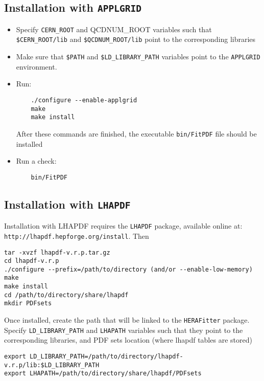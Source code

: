 \subsection{Installation with {\tt APPLGRID}}
\begin{itemize}
\item
 Specify {\tt CERN\_ROOT} and {QCDNUM\_ROOT} variables such that\\
     \verb'$CERN_ROOT/lib' and \verb'$QCDNUM_ROOT/lib'
 point to the corresponding libraries
\item Make sure that {\tt \$PATH} and {\tt \$LD\_LIBRARY\_PATH} 
variables point to the {\tt APPLGRID} environment.
\item Run:
\begin{verbatim}
    ./configure --enable-applgrid
    make 
    make install
\end{verbatim}
After these commands are finished, the executable {\tt bin/FitPDF} 
file should be installed
\item  Run a check:
\begin{verbatim}
    bin/FitPDF 
\end{verbatim}
\end{itemize}
\subsection{Installation with {\tt LHAPDF}}\label{sec:install_lhapdf}

Installation with LHAPDF requires the {\tt LHAPDF} package, available online at:\\
{\tt http://lhapdf.hepforge.org/install}.
Then
\begin{verbatim}
tar -xvzf lhapdf-v.r.p.tar.gz
cd lhapdf-v.r.p
./configure --prefix=/path/to/directory (and/or --enable-low-memory)
make
make install
cd /path/to/directory/share/lhapdf
mkdir PDFsets
\end{verbatim}

Once installed, create the path that will be linked to the {\tt HERAFitter} package.\\
 Specify \verb'LD_LIBRARY_PATH'
     and {\tt LHAPATH} variables such that they
 point to the corresponding libraries, and PDF sets location (where lhapdf tables are stored)
\begin{verbatim}
export LD_LIBRARY_PATH=/path/to/directory/lhapdf-v.r.p/lib:$LD_LIBRARY_PATH
export LHAPATH=/path/to/directory/share/lhapdf/PDFsets
\end{verbatim}



